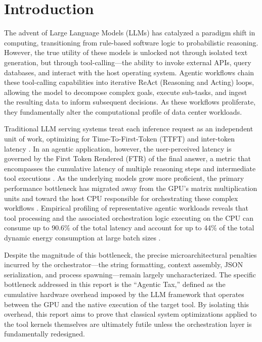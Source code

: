 \documentclass[10pt, letterpaper]{article}
\begin{document}
\section{Introduction}
The advent of Large Language Models (LLMs) has catalyzed a paradigm shift in computing, transitioning from rule-based software logic to probabilistic reasoning. However, the true utility of these models is unlocked not through isolated text generation, but through tool-calling---the ability to invoke external APIs, query databases, and interact with the host operating system. Agentic workflows chain these tool-calling capabilities into iterative ReAct (Reasoning and Acting) loops, allowing the model to decompose complex goals, execute sub-tasks, and ingest the resulting data to inform subsequent decisions. As these workflows proliferate, they fundamentally alter the computational profile of data center workloads.

Traditional LLM serving systems treat each inference request as an independent unit of work, optimizing for Time-To-First-Token (TTFT) and inter-token latency \cite{data_systems, sutradhara}. In an agentic application, however, the user-perceived latency is governed by the First Token Rendered (FTR) of the final answer, a metric that encompasses the cumulative latency of multiple reasoning steps and intermediate tool executions \cite{data_systems}. As the underlying models grow more proficient, the primary performance bottleneck has migrated away from the GPU's matrix multiplication units and toward the host CPU responsible for orchestrating these complex workflows \cite{cpu_centric}. Empirical profiling of representative agentic workloads reveals that tool processing and the associated orchestration logic executing on the CPU can consume up to 90.6\% of the total latency and account for up to 44\% of the total dynamic energy consumption at large batch sizes \cite{cpu_centric}.

Despite the magnitude of this bottleneck, the precise microarchitectural penalties incurred by the orchestrator---the string formatting, context assembly, JSON serialization, and process spawning---remain largely uncharacterized. The specific bottleneck addressed in this report is the ``Agentic Tax,'' defined as the cumulative hardware overhead imposed by the LLM framework that operates between the GPU and the native execution of the target tool. By isolating this overhead, this report aims to prove that classical system optimizations applied to the tool kernels themselves are ultimately futile unless the orchestration layer is fundamentally redesigned. 
\end{document}
